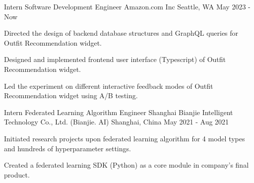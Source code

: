 

\begin{cventries}

  \cventry
    {Intern Software Development Engineer} %
    {Amazon.com Inc} %
    {Seattle, WA} %
    {May 2023 - Now} %
    {
      \begin{cvitems} %
        \item {Directed the design of backend database structures and GraphQL queries for Outfit Recommendation widget.}
        \item {Designed and implemented frontend user interface (Typescript) of Outfit Recommendation widget.}
        \item {Led the experiment on different interactive feedback modes of Outfit Recommendation widget using A/B testing.}
      \end{cvitems}
    }
  
  \cventry
    {Intern Federated Learning Algorithm Engineer} %
    {Shanghai Bianjie Intelligent Technology Co., Ltd. (Bianjie. AI)} %
    {Shanghai, China} %
    {May 2021 - Aug 2021} %
    {
      \begin{cvitems} %
        \item {Initiated research projects upon federated learning algorithm for 4 model types and hundreds of hyperparameter settings.}
        \item {Created a federated learning SDK (Python) as a core module in company's final product.}
      \end{cvitems}
    }

\end{cventries}